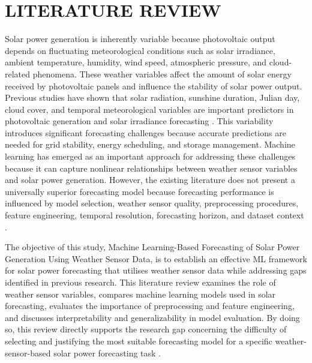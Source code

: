 \chapter{LITERATURE REVIEW}

Solar power generation is inherently variable because photovoltaic output depends on fluctuating meteorological conditions such as solar irradiance, ambient temperature, humidity, wind speed, atmospheric pressure, and cloud-related phenomena. These weather variables affect the amount of solar energy received by photovoltaic panels and influence the stability of solar power output. Previous studies have shown that solar radiation, sunshine duration, Julian day, cloud cover, and temporal meteorological variables are important predictors in photovoltaic generation and solar irradiance forecasting \parencite{CarvalhoJunior2025, Pongphaw2025, TsaiLo2025}. This variability introduces significant forecasting challenges because accurate predictions are needed for grid stability, energy scheduling, and storage management. Machine learning has emerged as an important approach for addressing these challenges because it can capture nonlinear relationships between weather sensor variables and solar power generation. However, the existing literature does not present a universally superior forecasting model because forecasting performance is influenced by model selection, weather sensor quality, preprocessing procedures, feature engineering, temporal resolution, forecasting horizon, and dataset context \parencite{JnanaVarshitha2025, Bakht2025, Eren2025, Alhassan2025}.

The objective of this study, Machine Learning-Based Forecasting of Solar Power Generation Using Weather Sensor Data, is to establish an effective ML framework for solar power forecasting that utilises weather sensor data while addressing gaps identified in previous research. This literature review examines the role of weather sensor variables, compares machine learning models used in solar forecasting, evaluates the importance of preprocessing and feature engineering, and discusses interpretability and generalizability in model evaluation. By doing so, this review directly supports the research gap concerning the difficulty of selecting and justifying the most suitable forecasting model for a specific weather-sensor-based solar power forecasting task \parencite{JnanaVarshitha2025, Alhassan2025, ArellanosTafur2025}.

